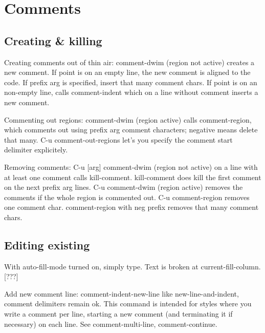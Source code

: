\documentclass[a4paper]{report}
\begin{document}
\author{Florian Kaufmann}
\title{}
\date{\today}
\maketitle

\begin{abstract}
\end{abstract}

\tableofcontents

\section{Comments}

\subsection{Creating & killing}

Creating comments out of thin air: comment-dwim (region not active)
creates a new comment. If point is on an empty line, the new comment is
aligned to the code. If prefix arg is specified, insert that many
comment chars. If point is on an non-empty line, calls comment-indent
which on a line without comment inserts a new comment.

Commenting out regions: comment-dwim (region active) calls
comment-region, which comments out using prefix arg comment characters;
negative means delete that many. C-u comment-out-regions let's you
specify the comment start delimiter explicitely.

Removing comments: C-u [arg] comment-dwim (region not active) on a line
with at least one comment calls kill-comment. kill-comment does kill the
first comment on the next prefix arg lines. C-u comment-dwim (region
active) removes the comments if the whole region is commented out. C-u
comment-region removes one comment char. comment-region with neg prefix
removes that many comment chars.

\subsection{Editing existing}

With auto-fill-mode turned on, simply type. Text is broken at
current-fill-column. [???]

Add new comment line: comment-indent-new-line like new-line-and-indent,
comment delimiters remain ok. This command is intended for styles where
you write a comment per line, starting a new comment (and terminating it
if necessary) on each line. See comment-multi-line, comment-continue.
\end{document}
